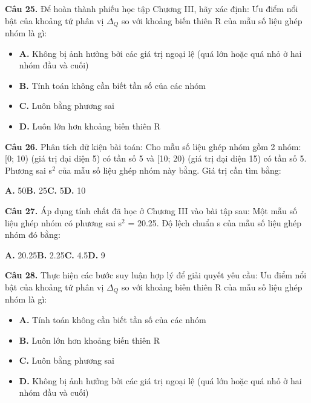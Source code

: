 \documentclass[11pt,a4paper]{article}
\begin{document}
\textbf{\color{primary} Câu 25.} Để hoàn thành phiếu học tập Chương III, hãy xác định: Ưu điểm nổi bật của khoảng tứ phân vị $\Delta_Q$ so với khoảng biến thiên R của mẫu số liệu ghép nhóm là gì:\par
\begin{itemize}\setlength{\itemsep}{1pt}\setlength{\parskip}{0pt}
  \item[] \textbf{A.} Không bị ảnh hưởng bởi các giá trị ngoại lệ (quá lớn hoặc quá nhỏ ở hai nhóm đầu và cuối)
  \item[] \textbf{B.} Tính toán không cần biết tần số của các nhóm
  \item[] \textbf{C.} Luôn bằng phương sai
  \item[] \textbf{D.} Luôn lớn hơn khoảng biến thiên R
\end{itemize}\vspace{2pt}
\textbf{\color{primary} Câu 26.} Phân tích dữ kiện bài toán: Cho mẫu số liệu ghép nhóm gồm 2 nhóm: [0; 10) (giá trị đại diện 5) có tần số 5 và [10; 20) (giá trị đại diện 15) có tần số 5. Phương sai s$^2$ của mẫu số liệu ghép nhóm này bằng. Giá trị cần tìm bằng:\par
\hspace*{1.5em}\textbf{A.} 50\quad\quad \textbf{B.} 25\quad\quad \textbf{C.} 5\quad\quad \textbf{D.} 10\par\vspace{2pt}
\textbf{\color{primary} Câu 27.} Áp dụng tính chất đã học ở Chương III vào bài tập sau: Một mẫu số liệu ghép nhóm có phương sai s$^2$ = 20.25. Độ lệch chuẩn s của mẫu số liệu ghép nhóm đó bằng:\par
\hspace*{1.5em}\textbf{A.} 20.25\quad\quad \textbf{B.} 2.25\quad\quad \textbf{C.} 4.5\quad\quad \textbf{D.} 9\par\vspace{2pt}
\textbf{\color{primary} Câu 28.} Thực hiện các bước suy luận hợp lý để giải quyết yêu cầu: Ưu điểm nổi bật của khoảng tứ phân vị $\Delta_Q$ so với khoảng biến thiên R của mẫu số liệu ghép nhóm là gì:\par
\begin{itemize}\setlength{\itemsep}{1pt}\setlength{\parskip}{0pt}
  \item[] \textbf{A.} Tính toán không cần biết tần số của các nhóm
  \item[] \textbf{B.} Luôn lớn hơn khoảng biến thiên R
  \item[] \textbf{C.} Luôn bằng phương sai
  \item[] \textbf{D.} Không bị ảnh hưởng bởi các giá trị ngoại lệ (quá lớn hoặc quá nhỏ ở hai nhóm đầu và cuối)
\end{itemize}\vspace{2pt}
\end{document}
